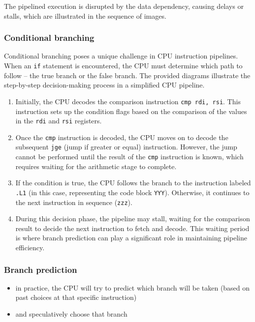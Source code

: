 \documentclass[12pt]{article}
\begin{document}
The pipelined execution is disrupted by the data dependency, causing delays or stalls, which are illustrated in the sequence of images.

\subsubsection{Conditional branching}

Conditional branching poses a unique challenge in CPU instruction pipelines. When an \texttt{if} statement is encountered, the CPU must determine which path to follow – the true branch or the false branch. The provided diagrams illustrate the step-by-step decision-making process in a simplified CPU pipeline.

\begin{enumerate}
    \item Initially, the CPU decodes the comparison instruction \texttt{cmp rdi, rsi}. This instruction sets up the condition flags based on the comparison of the values in the \texttt{rdi} and \texttt{rsi} registers.
    
    \item Once the \texttt{cmp} instruction is decoded, the CPU moves on to decode the subsequent \texttt{jge} (jump if greater or equal) instruction. However, the jump cannot be performed until the result of the \texttt{cmp} instruction is known, which requires waiting for the arithmetic stage to complete.
    
    \item If the condition is true, the CPU follows the branch to the instruction labeled \texttt{.L1} (in this case, representing the code block \texttt{YYY}). Otherwise, it continues to the next instruction in sequence (\texttt{zzz}).
    
    \item During this decision phase, the pipeline may stall, waiting for the comparison result to decide the next instruction to fetch and decode. This waiting period is where branch prediction can play a significant role in maintaining pipeline efficiency.
\end{enumerate}
\subsubsection{Branch prediction}

\begin{itemize}
\item in practice, the CPU will try to predict which branch will be taken (based on past choices at that specific instruction)
\item and speculatively choose that branch
\end{itemize}
\end{document}
